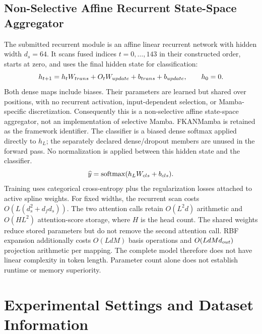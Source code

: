 \documentclass{revision_assets/ieeeaccess_revision}
\newif\ifrevisionhighlights
\newenvironment{revision}{\ifrevisionhighlights\begin{shaded*}\fi}{\ifrevisionhighlights\end{shaded*}\fi}
\begin{document}
\subsection{Non-Selective Affine Recurrent State-Space Aggregator}
\label{sec:ssm}
\begin{revision}
The submitted recurrent module is an affine linear recurrent network with hidden width $d_s=64$. It scans fused indices $t=0,\ldots,143$ in their constructed order, starts at zero, and uses the final hidden state for classification:
\begin{equation}
h_{t+1}=h_tW_{\rm trans}+O_tW_{\rm update}+b_{\rm trans}+b_{\rm update},\qquad h_0=0.
\label{eq:ssm_update}
\end{equation}
Both dense maps include biases. Their parameters are learned but shared over positions, with no recurrent activation, input-dependent selection, or Mamba-specific discretization. Consequently this is a non-selective affine state-space aggregator, not an implementation of selective Mamba. FKANMamba is retained as the framework identifier. The classifier is a biased dense softmax applied directly to $h_L$; the separately declared dense/dropout members are unused in the forward pass. No normalization is applied between this hidden state and the classifier.
\begin{equation}
\widehat y=\operatorname{softmax}(h_LW_{\rm cls}+b_{\rm cls}).
\label{eq:ssm_softmax}
\end{equation}
Training uses categorical cross-entropy plus the regularization losses attached to active spline weights. For fixed widths, the recurrent scan costs $O(L(d_s^2+d_fd_s))$. The two attention calls retain $O(L^2d)$ arithmetic and $O(HL^2)$ attention-score storage, where $H$ is the head count. The shared weights reduce stored parameters but do not remove the second attention call. RBF expansion additionally costs $O(LdM)$ basis operations and $O(LdMd_{\rm out})$ projection arithmetic per mapping. The complete model therefore does not have linear complexity in token length. Parameter count alone does not establish runtime or memory superiority.
\end{revision}

\section{Experimental Settings and Dataset Information}
\label{sec:experiments}
\end{document}
